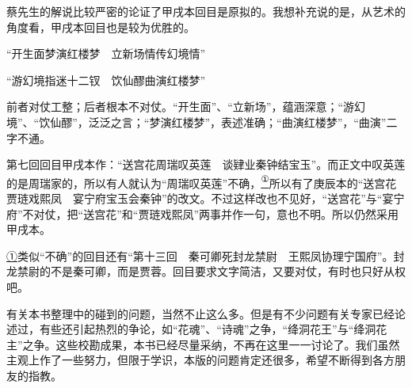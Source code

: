 蔡先生的解说比较严密的论证了甲戌本回目是原拟的。我想补充说的是，从艺术的角度看，甲戌本回目也是较为优胜的。

``开生面梦演红楼梦　立新场情传幻境情''

``游幻境指迷十二钗　饮仙醪曲演红楼梦''

前者对仗工整；后者根本不对仗。``开生面''、``立新场''，蕴涵深意；``游幻境''、``饮仙醪''，泛泛之言；``梦演红楼梦''，表述准确；``曲演红楼梦''，``曲演''二字不通。

第七回回目甲戌本作：``送宫花周瑞叹英莲　谈肄业秦钟结宝玉''。而正文中叹英莲的是周瑞家的，所以有人就认为``周瑞叹英莲''不确，\href{../Text/part0088.html\#lnkback_a1_a}{\textsuperscript{①}}\href{../Text/part0088.html\#lnkback_t_a}{}所以有了庚辰本的``送宫花贾琏戏熙凤　宴宁府宝玉会秦钟''的改文。不过这样改也不见好，``送宫花''与``宴宁府''不对仗，把``送宫花''和``贾琏戏熙凤''两事并作一句，意也不明。所以仍然采用甲戌本。

{\href{../Text/part0088.html\#navto_a1_a}{①}类似``不确''的回目还有``第十三回　秦可卿死封龙禁尉　王熙凤协理宁国府''。封龙禁尉的不是秦可卿，而是贾蓉。回目要求文字简洁，又要对仗，有时也只好从权吧。}

\href{../Text/part0088.html\#navto_t_a}{}

有关本书整理中的碰到的问题，当然不止这么多。但是有不少问题有关专家已经论述过，有些还引起热烈的争论，如``花魂''、``诗魂''之争，``绛洞花王''与``绛洞花主''之争。这些校勘成果，本书已经尽量采纳，不再在这里一一讨论了。我们虽然主观上作了一些努力，但限于学识，本版的问题肯定还很多，希望不断得到各方朋友的指教。